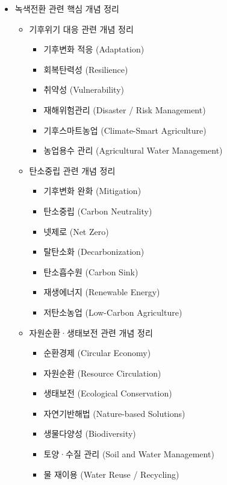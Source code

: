 \documentclass[11pt,a4paper]{article}
\begin{document}
\begin{itemize}
    \item 녹색전환 관련 핵심 개념 정리
    \begin{itemize}
        \item 기후위기 대응 관련 개념 정리
        \begin{itemize}
            \item 기후변화 적응 (Adaptation)
            \item 회복탄력성 (Resilience)
            \item 취약성 (Vulnerability)
            \item 재해위험관리 (Disaster / Risk Management)
            \item 기후스마트농업 (Climate-Smart Agriculture)
            \item 농업용수 관리 (Agricultural Water Management)
        \end{itemize}
        \item 탄소중립 관련 개념 정리
        \begin{itemize}
            \item 기후변화 완화 (Mitigation)
            \item 탄소중립 (Carbon Neutrality)
            \item 넷제로 (Net Zero)
            \item 탈탄소화 (Decarbonization)
            \item 탄소흡수원 (Carbon Sink)
            \item 재생에너지 (Renewable Energy)
            \item 저탄소농업 (Low-Carbon Agriculture)
        \end{itemize}
        \item 자원순환·생태보전 관련 개념 정리
        \begin{itemize}
            \item 순환경제 (Circular Economy)
            \item 자원순환 (Resource Circulation)
            \item 생태보전 (Ecological Conservation)
            \item 자연기반해법 (Nature-based Solutions)
            \item 생물다양성 (Biodiversity)
            \item 토양·수질 관리 (Soil and Water Management)
            \item 물 재이용 (Water Reuse / Recycling)
        \end{itemize}
    \end{itemize}


\end{itemize}
\end{document}
